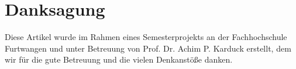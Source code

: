 \section{Danksagung}
Diese Artikel wurde im Rahmen eines Semesterprojekts an der Fachhochschule Furtwangen und unter Betreuung von Prof. Dr. Achim P. Karduck erstellt, dem wir für die gute Betreuung und die vielen Denkanstöße danken.